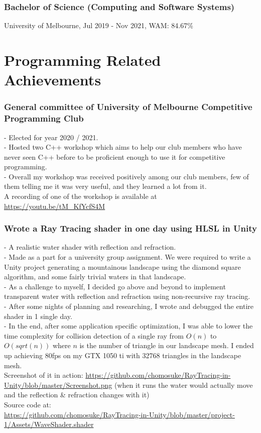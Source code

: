 \documentclass[9pt]{extarticle}
\begin{document}
\subsubsection*{Bachelor of Science (Computing and Software Systems)}
University of Melbourne, Jul 2019 - Nov 2021, WAM: 84.67\%

\section*{Programming Related Achievements}
\subsubsection*{General committee of University of Melbourne Competitive Programming Club}
- Elected for year 2020 / 2021.\\
- Hosted two C++ workshop which aims to help our club members who have never seen C++ before to be proficient enough to use it for competitive programming.\\
- Overall my workshop was received positively among our club members, few of them telling me it was very useful, and they learned a lot from it.\\
A recording of one of the workshop is available at \url{https://youtu.be/tM_KfYcfS4M}

\subsubsection*{Wrote a Ray Tracing shader in one day using HLSL in Unity}
- A realistic water shader with reflection and refraction.\\
- Made as a part for a university group assignment. We were required to write a Unity project generating a mountainous landscape using the diamond square algorithm, and some fairly trivial waters in that landscape.\\
- As a challenge to myself, I decided go above and beyond to implement transparent water with reflection and refraction using non-recursive ray tracing.\\
- After some nights of planning and researching, I wrote and debugged the entire shader in 1 single day.\\
- In the end, after some application specific optimization, I was able to lower the time complexity for collision detection of a single ray from \(O(n)\) to \(O(sqrt(n))\) where \(n\) is the number of triangle in our landscape mesh. I ended up achieving 80fps on my GTX 1050 ti with 32768 triangles in the landscape mesh.\\
Screenshot of it in action: \url{https://github.com/chomosuke/RayTracing-in-Unity/blob/master/Screenshot.png} (when it runs the water would actually move and the reflection \& refraction changes with it)\\
Source code at:\\
\url{https://github.com/chomosuke/RayTracing-in-Unity/blob/master/project-1/Assets/WaveShader.shader}
\end{document}
